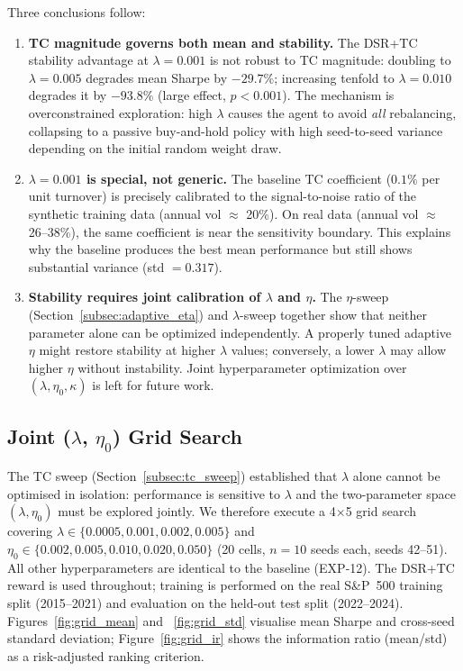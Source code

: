 \documentclass[conference]{IEEEtran}
\begin{document}
Three conclusions follow:
\begin{enumerate}
    \item \textbf{TC magnitude governs both mean and stability.}
    The DSR+TC stability advantage at $\lambda=0.001$ is not
    robust to TC magnitude: doubling to $\lambda=0.005$ degrades
    mean Sharpe by $-29.7\%$; increasing tenfold to $\lambda=0.010$
    degrades it by $-93.8\%$ (large effect, $p<0.001$).
    The mechanism is overconstrained exploration: high $\lambda$
    causes the agent to avoid \emph{all} rebalancing, collapsing
    to a passive buy-and-hold policy with high seed-to-seed
    variance depending on the initial random weight draw.

    \item \textbf{$\lambda=0.001$ is special, not generic.}
    The baseline TC coefficient ($0.1\%$ per unit turnover)
    is precisely calibrated to the signal-to-noise ratio of
    the synthetic training data (annual vol $\approx$ 20\%).
    On real data (annual vol $\approx$ 26--38\%), the same
    coefficient is near the sensitivity boundary. This explains
    why the baseline produces the best mean performance but still
    shows substantial variance (std $= 0.317$).

    \item \textbf{Stability requires joint calibration of $\lambda$ and $\eta$.}
    The $\eta$-sweep (Section~\ref{subsec:adaptive_eta}) and
    $\lambda$-sweep together show that neither parameter alone
    can be optimized independently. A properly tuned adaptive
    $\eta$ might restore stability at higher $\lambda$ values;
    conversely, a lower $\lambda$ may allow higher $\eta$ without
    instability. Joint hyperparameter optimization over
    $(\lambda, \eta_0, \kappa)$ is left for future work.
\end{enumerate}

\subsection{Joint ($\lambda$, $\eta_0$) Grid Search}
\label{subsec:grid_search}

The TC sweep (Section~\ref{subsec:tc_sweep}) established that $\lambda$
alone cannot be optimised in isolation: performance is sensitive to
$\lambda$ and the two-parameter space $(\lambda, \eta_0)$ must be
explored jointly. We therefore execute a 4$\times$5 grid search
covering $\lambda \in \{0.0005, 0.001, 0.002, 0.005\}$ and
$\eta_0 \in \{0.002, 0.005, 0.010, 0.020, 0.050\}$ (20 cells,
$n=10$ seeds each, seeds 42--51).
All other hyperparameters are identical to the baseline (EXP-12).
The DSR+TC reward is used throughout; training is performed on the
real S\&P~500 training split (2015--2021) and evaluation on the
held-out test split (2022--2024). Figures~\ref{fig:grid_mean} and
~\ref{fig:grid_std} visualise mean Sharpe and cross-seed standard
deviation; Figure~\ref{fig:grid_ir} shows the information ratio
(mean/std) as a risk-adjusted ranking criterion.
\end{document}
